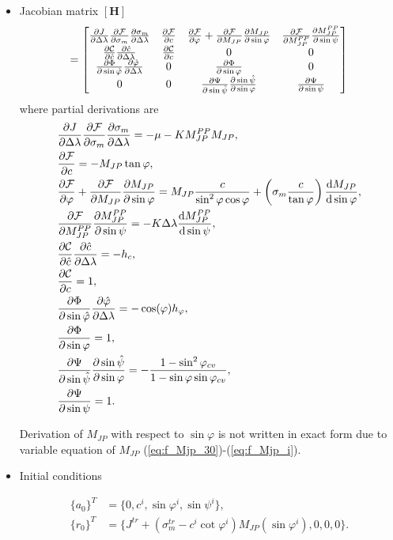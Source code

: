 \begin{itemize}
	\item Jacobian matrix $[\textbf{H}]$
	\begin{equation}
		[\text{\textbf{H}}] = \mqty[\pdv{J}{\Delta \lambda} \pdv{\mathcal{F}}{\sigma_m} \pdv{\sigma_m}{\Delta \lambda} & \pdv{\mathcal{F}}{c} & \pdv{\mathcal{F}}{\varphi} + \pdv{\mathcal{F}}{M_{JP}} \pdv{M_{JP}}{\sin \varphi} & \pdv{\mathcal{F}}{M_{JP}^{PP}} \pdv{M_{JP}^{PP}}{\sin \psi}\\
		\pdv{\mathcal{C}}{\hat{c}} \pdv{\hat{c}}{\Delta \lambda} & \pdv{\mathcal{C}}{c} & 0 & 0\\
		\pdv{\mathrm{\Phi}}{\sin \hat{\varphi}} \pdv{\hat{\varphi}}{\Delta \lambda} & 0 & \pdv{\mathrm{\Phi}}{\sin \varphi} & 0 \\
		0 & 0 & \pdv{\mathrm{\Psi}}{\sin \hat{\psi}} \pdv{\sin \hat{\psi}}{\sin \varphi} & \pdv{\mathrm{\Psi}}{\sin \psi}]
	\end{equation}
	where partial derivations are
	\begin{align}
		&\pdv{J}{\Delta \lambda} \pdv{\mathcal{F}}{\sigma_m} \pdv{\sigma_m}{\Delta \lambda}  = -\mu - K M_{JP}^{PP}M_{JP},\\
		&\pdv{\mathcal{F}}{c} = -M_{JP}\tan\varphi,\\
		&\pdv{\mathcal{F}}{\varphi} + \pdv{\mathcal{F}}{M_{JP}} \pdv{M_{JP}}{\sin \varphi} = M_{JP} \dfrac{c}{\sin^2\varphi \cos\varphi} + \left( \sigma_m \dfrac{c}{\tan \varphi} \right) \dv{M_{JP}}{\sin \varphi}, \\
		&\pdv{\mathcal{F}}{M_{JP}^{PP}} \pdv{M_{JP}^{PP}}{\sin \psi} = -K \Delta \lambda \dv{M_{JP}^{PP}}{\sin \psi},\\
		&\pdv{\mathcal{C}}{\hat{c}} \pdv{\hat{c}}{\Delta \lambda} = -h_c, \\
		&\pdv{\mathcal{C}}{c} = 1,\\
		&\pdv{\mathrm{\Phi}}{\sin \hat{\varphi}} \pdv{\hat{\varphi}}{\Delta \lambda} = -\cos(\varphi) h_{\varphi},\\
		&\pdv{\mathrm{\Phi}}{\sin \varphi} = 1,\\
		&\pdv{\mathrm{\Psi}}{\sin \hat{\psi}} \pdv{\sin \hat{\psi}}{\sin \varphi} = -\dfrac{1 - \sin^2\varphi_{cv} }{1-\sin \varphi \sin \varphi_{cv}},\\
		&\pdv{\mathrm{\Psi}}{\sin \psi} = 1.
	\end{align}
	
	Derivation of $M_{JP}$ with respect to $\sin \varphi$ is not written in exact form due to variable equation of $M_{JP}$ (\ref{eq:f_Mjp_30})-(\ref{eq:f_Mjp_i}).
	
	\item Initial conditions
	
	\begin{align}
		\lbrace a_0 \rbrace^T &= \lbrace 0, c^i, \sin \varphi^i, \sin \psi^i \rbrace,\\
		\lbrace r_0 \rbrace^T &= \lbrace J^{tr} + (\sigma_m^{tr}-c^i\cot\varphi^i)M_{JP}(\sin\varphi^i), 0, 0, 0 \rbrace.
	\end{align}
	
\end{itemize} 

